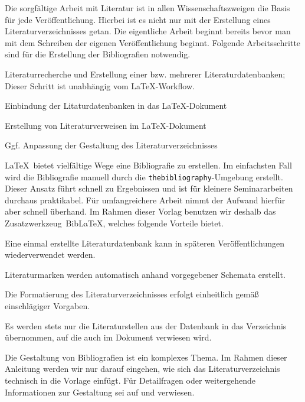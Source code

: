 Die sorgfältige Arbeit mit Literatur ist in allen Wissenschaftszweigen die
Basis für jede Veröffentlichung. Hierbei ist es nicht nur mit der Erstellung
eines Literaturverzeichnisses getan. Die eigentliche Arbeit beginnt bereits
bevor man mit dem Schreiben der eigenen Veröffentlichung beginnt. Folgende
Arbeitsschritte sind für die Erstellung der Bibliografien notwendig.
%
\begin{compactenum}
\item Literaturrecherche und Erstellung einer bzw. mehrerer
      Literaturdatenbanken; Dieser Schritt ist unabhängig vom \LaTeX-Workflow.
\item Einbindung der Litaturdatenbanken in das \LaTeX-Dokument
\item Erstellung von Literaturverweisen im \LaTeX-Dokument
\item Ggf. Anpassung der Gestaltung des Literaturverzeichnisses
\end{compactenum}

\LaTeX\ bietet vielfältige Wege eine Bibliografie zu erstellen. Im einfachsten
Fall wird die Bibliografie manuell durch die \texttt{thebibliography}-Umgebung
erstellt. Dieser Ansatz führt schnell zu Ergebnissen und ist für kleinere
Seminararbeiten durchaus praktikabel. Für umfangreichere Arbeit nimmt der
Aufwand hierfür aber schnell überhand. Im Rahmen dieser Vorlag benutzen wir
deshalb das Zusatzwerkzeug~Bib\LaTeX, welches folgende Vorteile bietet.
%
\begin{compactitem}
\item Eine einmal erstellte Literaturdatenbank kann in späteren
      Veröffentlichungen wiederverwendet werden.
\item Literaturmarken werden automatisch anhand vorgegebener Schemata erstellt.
\item Die Formatierung des Literaturverzeichnisses erfolgt einheitlich gemäß
      einschlägiger Vorgaben.
\item Es werden stets nur die Literaturstellen aus der Datenbank in das
      Verzeichnis übernommen, auf die auch im Dokument verwiesen wird.
\end{compactitem}

Die Gestaltung von Bibliografien ist ein komplexes Thema. Im Rahmen dieser
Anleitung werden wir nur darauf eingehen, wie sich das Literaturverzeichnis
technisch in die Vorlage einfügt. Für Detailfragen oder weitergehende
Informationen zur Gestaltung sei auf \cite{voss_bibliografien} und
\cite[Kapitel~13]{voss_wissenschaftliche_arbeit} verwiesen.
